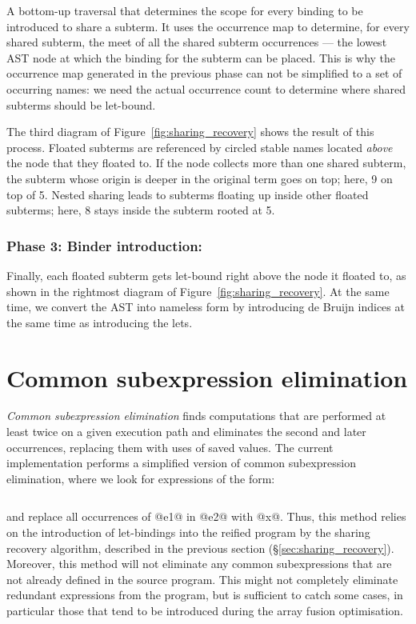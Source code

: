 A bottom-up traversal that determines the scope for every binding to be
introduced to share a subterm. It uses the occurrence map to determine, for
every shared subterm, the meet of all the shared subterm occurrences --- the
lowest AST node at which the binding for the subterm can be placed. This is why
the occurrence map generated in the previous phase can not be simplified to a
set of occurring names: we need the actual occurrence count to determine where
shared subterms should be let-bound.

The third diagram of Figure~\ref{fig:sharing_recovery} shows the result of this
process. Floated subterms are referenced by circled stable names located
\emph{above} the node that they floated to. If the node collects more than one
shared subterm, the subterm whose origin is deeper in the original term goes on
top; here, 9 on top of 5. Nested sharing leads to subterms floating up inside
other floated subterms; here, 8 stays inside the subterm rooted at 5.


\subsubsection*{Phase 3: Binder introduction:}

Finally, each floated subterm gets let-bound right above the node it floated to,
as shown in the rightmost diagram of Figure~\ref{fig:sharing_recovery}. At the
same time, we convert the AST into nameless  form by
introducing de Bruijn indices at the same time as introducing the lets.


\section{Common subexpression elimination}
\label{sec:cse}

\emph{Common subexpression elimination} finds computations that are performed at
least twice on a given execution path and eliminates the second and later
occurrences, replacing them with uses of saved values. The current
implementation performs a simplified version of common subexpression
elimination, where we look for expressions of the form:
%
\begin{lstlisting}[style=Haskell,numbers=none]
%\bf$\langle$ common subexpression elimination $\rangle$% let x = e1 in [x/e1]e2
\end{lstlisting}
%
and replace all occurrences of @e1@ in @e2@ with @x@. Thus, this method relies on the
introduction of let-bindings into the reified program by the sharing recovery algorithm, described
in the previous section (\S\ref{sec:sharing_recovery}). Moreover, this method will not eliminate any
common subexpressions that are not already defined in the source program. This might not completely
eliminate redundant expressions from the program, but is sufficient to catch some cases, in
particular those that tend to be introduced during the array fusion optimisation.

